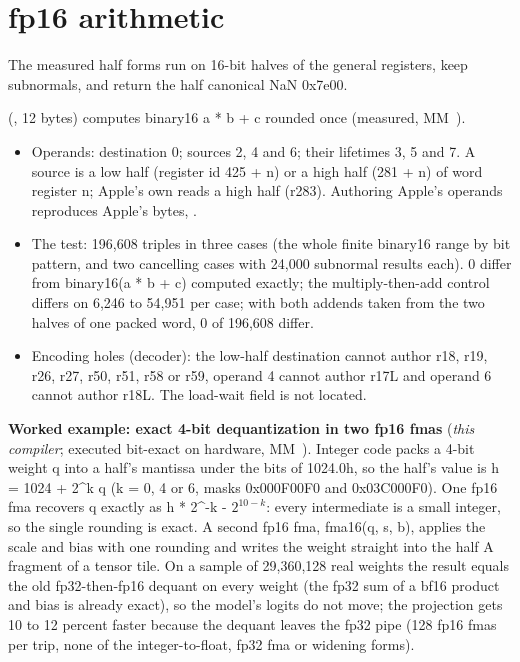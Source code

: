 \section{fp16 arithmetic}\label{sec:fp16-arithmetic}

The measured half forms run on 16-bit halves of the general registers, keep subnormals, and return the half canonical
NaN 0x7e00.

 (, 12 bytes) computes binary16 a * b + c rounded once (measured,
MM~).

\begin{itemize}
\item Operands: destination 0; sources 2, 4 and 6; their lifetimes 3, 5 and 7. A source is a low half (register id 425 + n)
  or a high half (281 + n) of word register n; Apple's own  reads a high half (r283). Authoring
  Apple's operands reproduces Apple's bytes, .
\item The test: 196,608 triples in three cases (the whole finite binary16 range by bit pattern, and two cancelling cases with
  24,000 subnormal results each). 0 differ from binary16(a * b + c) computed exactly; the multiply-then-add control
  differs on 6,246 to 54,951 per case; with both addends taken from the two halves of one packed word, 0 of 196,608
  differ.
\item Encoding holes (decoder): the low-half destination cannot author r18, r19, r26, r27, r50, r51, r58 or r59, operand 4
  cannot author r17L and operand 6 cannot author r18L. The load-wait field is not located.
\end{itemize}

\textbf{Worked example: exact 4-bit dequantization in two fp16 fmas} (\emph{this compiler}; executed bit-exact on hardware,
MM~). Integer code packs a 4-bit weight q into a half's mantissa under the bits of 1024.0h, so the half's value is
h = 1024 + 2\^{}k q (k = 0, 4 or 6, masks 0x000F00F0 and 0x03C000F0). One fp16 fma recovers q exactly as h * 2\^{}-k - $2^{10-k}$:
every intermediate is a small integer, so the single rounding is exact. A second fp16 fma, fma16(q, s, b), applies the
scale and bias with one rounding and writes the weight straight into the half A fragment of a tensor tile. On a sample
of 29,360,128 real weights the result equals the old fp32-then-fp16 dequant on every weight (the fp32 sum of a bf16
product and bias is already exact), so the model's logits do not move; the projection gets 10 to 12 percent faster because
the dequant leaves the fp32 pipe (128 fp16 fmas per trip, none of the integer-to-float, fp32 fma or widening forms).

